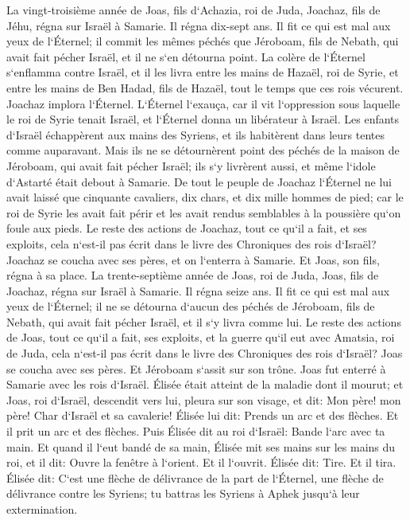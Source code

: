 \verse La vingt-troisième année de Joas, fils d`Achazia, roi de Juda, Joachaz, fils de Jéhu, régna sur Israël à Samarie. Il régna dix-sept ans. 
\verse Il fit ce qui est mal aux yeux de l`Éternel; il commit les mêmes péchés que Jéroboam, fils de Nebath, qui avait fait pécher Israël, et il ne s`en détourna point. 
\verse La colère de l`Éternel s`enflamma contre Israël, et il les livra entre les mains de Hazaël, roi de Syrie, et entre les mains de Ben Hadad, fils de Hazaël, tout le temps que ces rois vécurent. 
\verse Joachaz implora l`Éternel. L`Éternel l`exauça, car il vit l`oppression sous laquelle le roi de Syrie tenait Israël, 
\verse et l`Éternel donna un libérateur à Israël. Les enfants d`Israël échappèrent aux mains des Syriens, et ils habitèrent dans leurs tentes comme auparavant. 
\verse Mais ils ne se détournèrent point des péchés de la maison de Jéroboam, qui avait fait pécher Israël; ils s`y livrèrent aussi, et même l`idole d`Astarté était debout à Samarie. 
\verse De tout le peuple de Joachaz l`Éternel ne lui avait laissé que cinquante cavaliers, dix chars, et dix mille hommes de pied; car le roi de Syrie les avait fait périr et les avait rendus semblables à la poussière qu`on foule aux pieds. 
\verse Le reste des actions de Joachaz, tout ce qu`il a fait, et ses exploits, cela n`est-il pas écrit dans le livre des Chroniques des rois d`Israël? 
\verse Joachaz se coucha avec ses pères, et on l`enterra à Samarie. Et Joas, son fils, régna à sa place. 
\verse La trente-septième année de Joas, roi de Juda, Joas, fils de Joachaz, régna sur Israël à Samarie. Il régna seize ans. 
\verse Il fit ce qui est mal aux yeux de l`Éternel; il ne se détourna d`aucun des péchés de Jéroboam, fils de Nebath, qui avait fait pécher Israël, et il s`y livra comme lui. 
\verse Le reste des actions de Joas, tout ce qu`il a fait, ses exploits, et la guerre qu`il eut avec Amatsia, roi de Juda, cela n`est-il pas écrit dans le livre des Chroniques des rois d`Israël? 
\verse Joas se coucha avec ses pères. Et Jéroboam s`assit sur son trône. Joas fut enterré à Samarie avec les rois d`Israël. 
\verse Élisée était atteint de la maladie dont il mourut; et Joas, roi d`Israël, descendit vers lui, pleura sur son visage, et dit: Mon père! mon père! Char d`Israël et sa cavalerie! 
\verse Élisée lui dit: Prends un arc et des flèches. Et il prit un arc et des flèches. 
\verse Puis Élisée dit au roi d`Israël: Bande l`arc avec ta main. Et quand il l`eut bandé de sa main, Élisée mit ses mains sur les mains du roi, 
\verse et il dit: Ouvre la fenêtre à l`orient. Et il l`ouvrit. Élisée dit: Tire. Et il tira. Élisée dit: C`est une flèche de délivrance de la part de l`Éternel, une flèche de délivrance contre les Syriens; tu battras les Syriens à Aphek jusqu`à leur extermination. 
